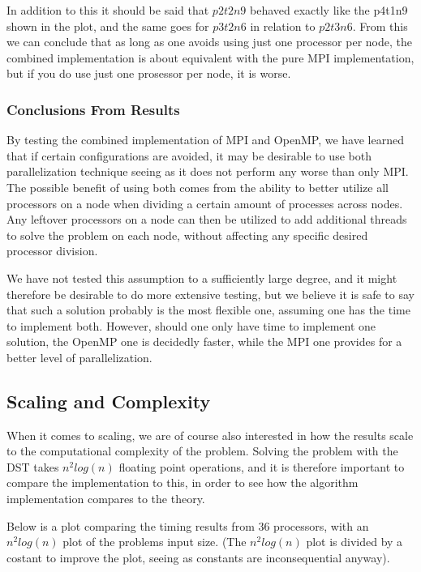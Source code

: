\documentclass[fontsize=11pt,paper=a4,titlepage]{article}
\begin{document}
In addition to this it should be said that $p2t2n9$ behaved exactly like the p4t1n9 shown in the plot, and the same goes for $p3t2n6$ in relation to $p2t3n6$. From this we can conclude that as long as one avoids using just one processor per node, the combined implementation is about equivalent with the pure MPI implementation, but if you do use just one prosessor per node, it is worse.

\subsubsection{Conclusions From Results}
By testing the combined implementation of MPI and OpenMP, we have learned that if certain configurations are avoided, it may be desirable to use both parallelization technique seeing as it does not perform any worse than only MPI. The possible benefit of using both comes from the ability to better utilize all processors on a node when dividing a certain amount of processes across nodes. Any leftover processors on a node can then be utilized to add additional threads to solve the problem on each node, without affecting any specific desired processor division. 

We have not tested this assumption to a sufficiently large degree, and it might therefore be desirable to do more extensive testing, but we believe it is safe to say that such a solution probably is the most flexible one, assuming one has the time to implement both. However, should one only have time to implement one solution, the OpenMP one is decidedly faster, while the MPI one provides for a better level of parallelization.

\subsection{Scaling and Complexity}
When it comes to scaling, we are of course also interested in how the results scale to the computational complexity of the problem. Solving the problem with the DST takes $n^2log(n)$ floating point operations, and it is therefore important to compare the implementation to this, in order to see how the algorithm implementation compares to the theory.

Below is a plot comparing the timing results from 36 processors, with an $n^2log(n)$ plot of the problems input size. (The $n^2log(n)$ plot is divided by a costant to improve the plot, seeing as constants are inconsequential anyway).
\end{document}
